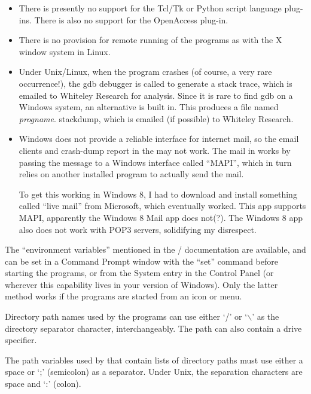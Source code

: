 \begin{itemize}
\item{There is presently no support for the Tcl/Tk or Python script 
language plug-ins.
There is also no support for the OpenAccess plug-in.
}

\item{There is no provision for remote running of the programs as
with the X window system in Linux.}

\item{Under Unix/Linux, when the program crashes (of course, a very
rare occurrence!), the {\vt gdb} debugger is called to generate a
stack trace, which is emailed to Whiteley Research for analysis. 
Since it is rare to find {\vt gdb} on a Windows system, an alternative
is built in.  This produces a file named {\it progname\/}.{\vt
stackdump}, which is emailed (if possible) to Whiteley Research.}

\item{Windows does not provide a reliable interface for internet mail,
so the email clients and crash-dump report in the {\XicTools} may not
work.  The mail in {\XicTools} works by passing the message to a
Windows interface called ``MAPI'', which in turn relies on another
installed program to actually send the mail.

To get this working in Windows 8, I had to download and install
something called ``live mail'' from Microsoft, which eventually
worked.  This app supports MAPI, apparently the Windows 8 Mail app
does not(?).  The Windows 8 app also does not work with POP3 servers,
solidifying my disrespect.}
\end{itemize}

The ``environment variables'' mentioned in the {\Xic}/{\WRspice}
documentation are available, and can be set in a {\cb Command Prompt}
window with the ``{\vt set}'' command before starting the programs, or
from the {\cb System} entry in the {\cb Control Panel} (or wherever
this capability lives in your version of Windows).  Only the latter
method works if the programs are started from an icon or menu.

Directory path names used by the programs can use either `/' or
`$\backslash$' as the directory separator character, interchangeably. 
The path can also contain a drive specifier.

The path variables used by {\Xic} that contain lists of directory
paths must use either a space or `;' (semicolon) as a separator. 
Under Unix, the separation characters are space and `:' (colon).

